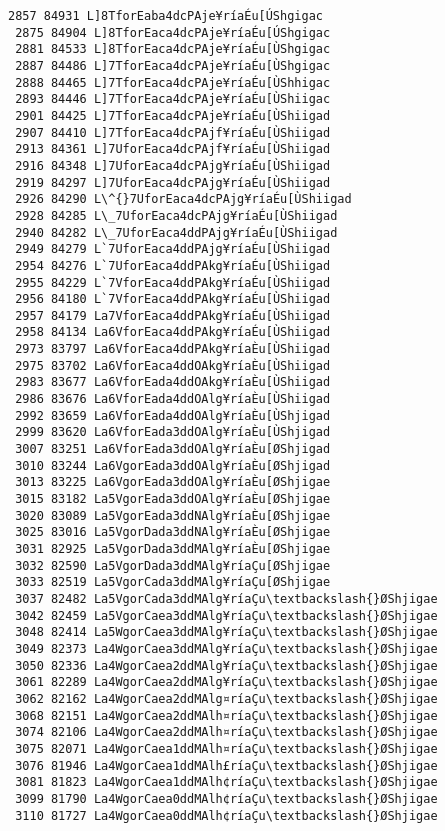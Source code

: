 \documentclass[11pt]{article}
\begin{document}
\begin{Verbatim}[commandchars=\\\{\}]
 2857 84931 L]8TforEaba4dcPAje¥ríaÉu[ÚShgigac
 2875 84904 L]8TforEaca4dcPAje¥ríaÉu[ÚShgigac
 2881 84533 L]8TforEaca4dcPAje¥ríaÉu[ÙShgigac
 2887 84486 L]7TforEaca4dcPAje¥ríaÉu[ÙShgigac
 2888 84465 L]7TforEaca4dcPAje¥ríaÉu[ÙShhigac
 2893 84446 L]7TforEaca4dcPAje¥ríaÉu[ÙShiigac
 2901 84425 L]7TforEaca4dcPAje¥ríaÉu[ÙShiigad
 2907 84410 L]7TforEaca4dcPAjf¥ríaÉu[ÙShiigad
 2913 84361 L]7UforEaca4dcPAjf¥ríaÉu[ÙShiigad
 2916 84348 L]7UforEaca4dcPAjg¥ríaÉu[ÙShiigad
 2919 84297 L]7UforEaca4dcPAjg¥ríaÉu[ÙShiigad
 2926 84290 L\^{}7UforEaca4dcPAjg¥ríaÉu[ÙShiigad
 2928 84285 L\_7UforEaca4dcPAjg¥ríaÉu[ÙShiigad
 2940 84282 L\_7UforEaca4ddPAjg¥ríaÉu[ÙShiigad
 2949 84279 L`7UforEaca4ddPAjg¥ríaÉu[ÙShiigad
 2954 84276 L`7UforEaca4ddPAkg¥ríaÉu[ÙShiigad
 2955 84229 L`7VforEaca4ddPAkg¥ríaÉu[ÙShiigad
 2956 84180 L`7VforEaca4ddPAkg¥ríaÉu[ÙShiigad
 2957 84179 La7VforEaca4ddPAkg¥ríaÉu[ÙShiigad
 2958 84134 La6VforEaca4ddPAkg¥ríaÉu[ÙShiigad
 2973 83797 La6VforEaca4ddPAkg¥ríaÈu[ÙShiigad
 2975 83702 La6VforEaca4ddOAkg¥ríaÈu[ÙShiigad
 2983 83677 La6VforEada4ddOAkg¥ríaÈu[ÙShiigad
 2986 83676 La6VforEada4ddOAlg¥ríaÈu[ÙShiigad
 2992 83659 La6VforEada4ddOAlg¥ríaÈu[ÙShjigad
 2999 83620 La6VforEada3ddOAlg¥ríaÈu[ÙShjigad
 3007 83251 La6VforEada3ddOAlg¥ríaÈu[ØShjigad
 3010 83244 La6VgorEada3ddOAlg¥ríaÈu[ØShjigad
 3013 83225 La6VgorEada3ddOAlg¥ríaÈu[ØShjigae
 3015 83182 La5VgorEada3ddOAlg¥ríaÈu[ØShjigae
 3020 83089 La5VgorEada3ddNAlg¥ríaÈu[ØShjigae
 3025 83016 La5VgorDada3ddNAlg¥ríaÈu[ØShjigae
 3031 82925 La5VgorDada3ddMAlg¥ríaÈu[ØShjigae
 3032 82590 La5VgorDada3ddMAlg¥ríaÇu[ØShjigae
 3033 82519 La5VgorCada3ddMAlg¥ríaÇu[ØShjigae
 3037 82482 La5VgorCada3ddMAlg¥ríaÇu\textbackslash{}ØShjigae
 3042 82459 La5VgorCaea3ddMAlg¥ríaÇu\textbackslash{}ØShjigae
 3048 82414 La5WgorCaea3ddMAlg¥ríaÇu\textbackslash{}ØShjigae
 3049 82373 La4WgorCaea3ddMAlg¥ríaÇu\textbackslash{}ØShjigae
 3050 82336 La4WgorCaea2ddMAlg¥ríaÇu\textbackslash{}ØShjigae
 3061 82289 La4WgorCaea2ddMAlg¥ríaÇu\textbackslash{}ØShjigae
 3062 82162 La4WgorCaea2ddMAlg¤ríaÇu\textbackslash{}ØShjigae
 3068 82151 La4WgorCaea2ddMAlh¤ríaÇu\textbackslash{}ØShjigae
 3074 82106 La4WgorCaea2ddMAlh¤ríaÇu\textbackslash{}ØShjigae
 3075 82071 La4WgorCaea1ddMAlh¤ríaÇu\textbackslash{}ØShjigae
 3076 81946 La4WgorCaea1ddMAlh£ríaÇu\textbackslash{}ØShjigae
 3081 81823 La4WgorCaea1ddMAlh¢ríaÇu\textbackslash{}ØShjigae
 3099 81790 La4WgorCaea0ddMAlh¢ríaÇu\textbackslash{}ØShjigae
 3110 81727 La4WgorCaea0ddMAlh¢ríaÇu\textbackslash{}ØShjigae

\end{Verbatim}
\end{document}

